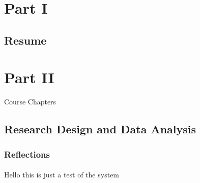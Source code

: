 \documentclass[12pt,titlepage]{article}
\begin{document}
\maketitle
\tableofcontents

\section{Part I}
\subsection{Resume}


\section{Part II}{Course Chapters}
\subsection{Research Design and Data Analysis}
\subsubsection{Reflections}

\paragraph{}
Hello this is just a test of the system





\end{document}
